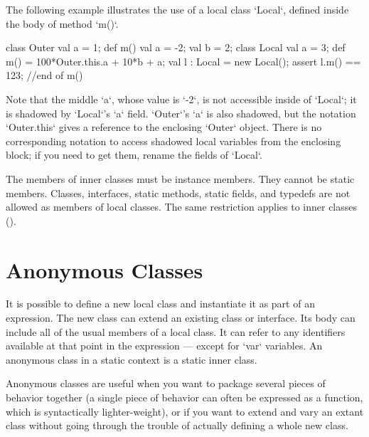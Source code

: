 \begin{ex}
The following example illustrates the use of a local class \xcd`Local`, 
defined inside the body of method \xcd`m()`. 
\begin{xten}
class Outer {
  val a = 1;
  def m() {
    val a = -2; 
    val b = 2;
    class Local {
      val a = 3;
      def m() = 100*Outer.this.a + 10*b + a; 
    }
    val l : Local = new Local();
    assert l.m() == 123;
  }//end of m()
}
\end{xten}
Note that the middle \xcd`a`,
whose value is \xcd`-2`, is not accessible inside of \xcd`Local`; it is
shadowed by \xcd`Local`'s \xcd`a` field.  \xcd`Outer`'s \xcd`a` is also
shadowed, but the notation \xcd`Outer.this` gives a reference to the enclosing
\xcd`Outer` object.  There is no corresponding notation to access shadowed local
variables from the enclosing block; if you need to get them, rename the fields
of \xcd`Local`.    
\end{ex}


The members of inner classes must be instance members.  They cannot be static
members.  Classes, interfaces, static methods, static fields, and typedefs are
not allowed as members of local classes. 
The same restriction applies to inner classes (). 





\section{Anonymous Classes}

It is possible to define a new local class and instantiate it as part of an
expression.  The new class can extend an existing class or interface.  Its body
can include all of the usual members of a local class. It can refer to any
identifiers available at that point in the expression --- except for \xcd`var`
variables.  An anonymous class in a static context is a static inner class.

Anonymous classes are useful when you want to package several pieces of
behavior together (a single piece of behavior can often be expressed as a
function, which is syntactically lighter-weight), or if you want to extend and
vary an extant class without going through the trouble of actually defining a
whole new class.

